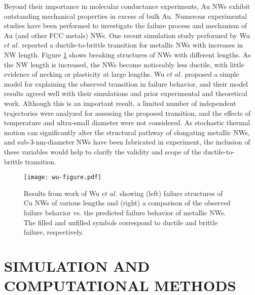 \documentclass[10pt]{report}  %
\begin{document}
Beyond their importance in molecular conductance experiments, Au NWs exhibit outstanding mechanical properties in excess of bulk Au. \cite{Seo:2011} Numerous experimental studies \cite{Richter:2009,Seo:2011,Yue:2011,Yue:2012} have been performed to investigate the failure process and mechanism of Au (and other FCC metals) NWs. One recent simulation study performed by Wu $et$ $al.$ \cite{Wu:2012} reported a ductile-to-brittle transition for metallic NWs with increases in NW length. Figure \ref{fig:wu-figure} shows breaking structures of NWs with different lengths. As the NW length is increased, the NWs become noticeably less ductile, with little evidence of necking or plasticity at large lengths. Wu $et$ $al.$ \cite{Wu:2012} proposed a simple model for explaining the observed transition in failure behavior, and their model results agreed well with their simulations and prior experimental and theoretical work. Although this is an important result, a limited number of independent trajectories were analyzed for assessing the proposed transition, and the effects of temperature and ultra-small diameter were not considered. As stochastic thermal motion can significantly alter the structural pathway of elongating metallic NWs, \cite{Pu:2008,French:2011,Iacovella:2011} and sub-3-nm-diameter NWs have been fabricated in experiment,\cite{Oshima:2003,Lu:2010} the inclusion of these variables would help to clarify the validity and scope of the ductile-to-brittle transition.  

%
% 
%
\begin{figure}[t!]
	\centering
	\texttt{[image: wu-figure.pdf]}
	\caption{Results from work of Wu $et$ $al.$ \protect\cite{Wu:2012} showing (left) failure structures of Cu NWs of various lengths and (right) a comparison of the observed failure behavior vs. the predicted failure behavior of metallic NWs. The filled and unfilled symbols correspond to ductile and brittle failure, respectively.   }
	\label{fig:wu-figure}
\end{figure}   

 


%
%
%
%
\chapter{SIMULATION AND COMPUTATIONAL METHODS}
\end{document}

